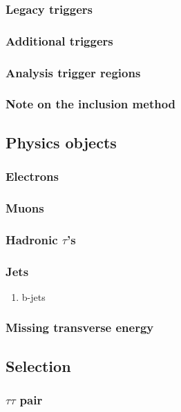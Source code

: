 \documentclass[11pt]{article}
\begin{document}
\subsubsection{Legacy triggers}
\label{sec:orgdd13f70}
\subsubsection{Additional triggers}
\label{sec:org720be00}
\subsubsection{Analysis trigger regions}
\label{sec:orgd37fe09}
\subsubsection{Note on the inclusion method}
\label{sec:org961a9e2}
\subsection{Physics objects}
\label{sec:org173c4db}
\subsubsection{Electrons}
\label{sec:org24bf9d1}
\subsubsection{Muons}
\label{sec:org0f4bf70}
\subsubsection{Hadronic \(\tau\)'s}
\label{sec:orgc1aa987}
\subsubsection{Jets}
\label{sec:orgd3e4d16}
\begin{enumerate}
\item b-jets
\label{sec:orged8bbb0}
\end{enumerate}
\subsubsection{Missing transverse energy}
\label{sec:org2654579}
\subsection{Selection}
\label{sec:org6d9e0d6}
\subsubsection{\(\tau \tau\) pair}
\label{sec:orgbbf2766}
\end{document}
